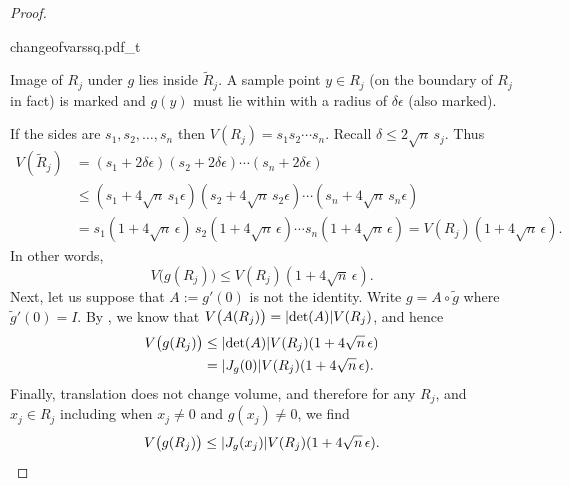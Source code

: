 \begin{proof}
\begin{myfigureht}
{changeofvarssq.pdf_t}
\caption{Image of $R_j$ under $g$ lies inside
$\widetilde{R}_j$.  A sample point $y \in R_j$ (on the boundary of $R_j$ in fact) is marked
and $g(y)$ must lie within with a radius of $\delta\epsilon$
(also marked).\label{changeofvarssq:fig}}
\end{myfigureht}


If the sides are $s_1,s_2,\ldots,s_n$ then
$V(R_j) = s_1 s_2 \cdots s_n$.   Recall $\delta \leq 2\sqrt{n} \, s_j$.  Thus
\begin{equation*}
\begin{split}
V(\widetilde{R}_j) & =
(s_1+2\delta \epsilon )
(s_2+2\delta \epsilon )
\cdots
(s_n+2\delta \epsilon )
\\
& \leq
(s_1+4 \sqrt{n}\,s_1 \epsilon )
(s_2+4 \sqrt{n}\,s_2 \epsilon )
\cdots
(s_n+4 \sqrt{n}\,s_n \epsilon )
\\
& =
s_1 (1+4 \sqrt{n}\, \epsilon )
\,
s_2 (1+4 \sqrt{n}\, \epsilon )
\cdots
s_n (1+4 \sqrt{n}\, \epsilon )
=
V(R_j) (1+4\sqrt{n} \, \epsilon) .
\end{split}
\end{equation*}
In other words,
\begin{equation*}
V\bigl(g(R_j)\bigr) \leq V(R_j) (1+4\sqrt{n} \, \epsilon) .
\end{equation*}
Next, let us suppose that $A := g'(0)$ is not the identity.
Write $g = A \circ \widetilde{g}$ where $\widetilde{g}'(0) = I$.
By ,
we know that $V\bigl(A(R_j)\bigr) = \lvert {\det(A)} \rvert V(R_j)$, and hence
\begin{equation*}
\begin{split}
V\bigl(g(R_j)\bigr) & \leq
\lvert {\det(A)} \rvert V(R_j) (1+4\sqrt{n} \, \epsilon) \\
& =
\lvert {J_g(0)} \rvert V(R_j) (1+4\sqrt{n} \, \epsilon) .
\end{split}
\end{equation*}
Finally, translation does not change volume, and therefore
for any $R_j$, and $x_j \in R_j$ including when $x_j \not= 0$ and $g(x_j)
\not= 0$, we find
\begin{equation*}
V\bigl(g(R_j)\bigr) \leq
\lvert {J_g(x_j)} \rvert V(R_j) (1+4\sqrt{n} \, \epsilon) .
\end{equation*}


\end{proof}
